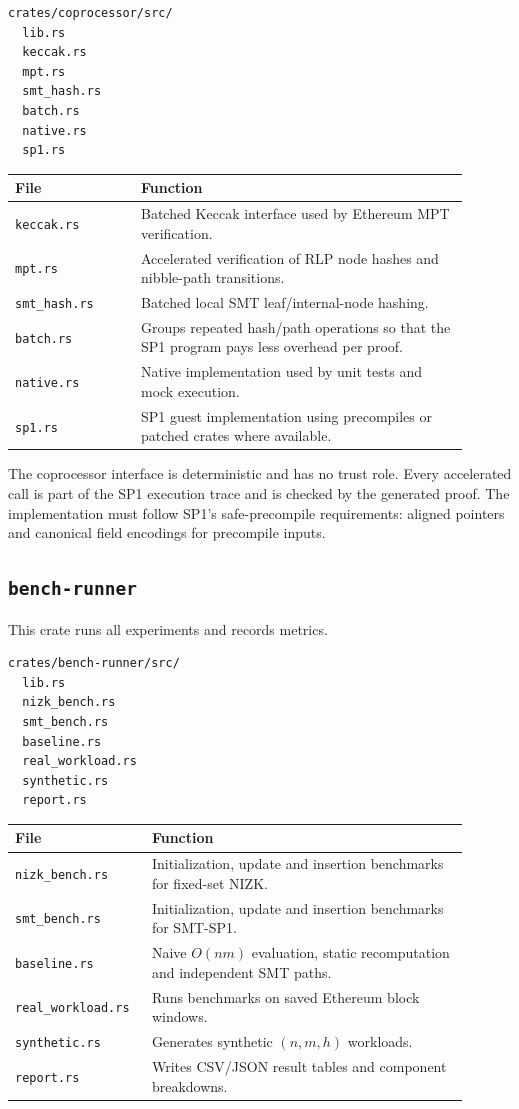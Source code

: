 \documentclass[UTF8,a4paper,11pt]{ctexart}
\begin{document}
\begin{lstlisting}
crates/coprocessor/src/
  lib.rs
  keccak.rs
  mpt.rs
  smt_hash.rs
  batch.rs
  native.rs
  sp1.rs
\end{lstlisting}

\begin{longtable}{p{0.25\linewidth}p{0.65\linewidth}}
\toprule
File & Function \\
\midrule
\texttt{keccak.rs} & Batched Keccak interface used by Ethereum MPT verification. \\
\texttt{mpt.rs} & Accelerated verification of RLP node hashes and nibble-path transitions. \\
\texttt{smt\_hash.rs} & Batched local SMT leaf/internal-node hashing. \\
\texttt{batch.rs} & Groups repeated hash/path operations so that the SP1 program pays less overhead per proof. \\
\texttt{native.rs} & Native implementation used by unit tests and mock execution. \\
\texttt{sp1.rs} & SP1 guest implementation using precompiles or patched crates where available. \\
\bottomrule
\end{longtable}

The coprocessor interface is deterministic and has no trust role. Every accelerated call is part of the SP1 execution trace and is checked by the generated proof. The implementation must follow SP1's safe-precompile requirements: aligned pointers and canonical field encodings for precompile inputs.

\subsection{\texttt{bench-runner}}

This crate runs all experiments and records metrics.

\begin{lstlisting}
crates/bench-runner/src/
  lib.rs
  nizk_bench.rs
  smt_bench.rs
  baseline.rs
  real_workload.rs
  synthetic.rs
  report.rs
\end{lstlisting}

\begin{longtable}{p{0.25\linewidth}p{0.65\linewidth}}
\toprule
File & Function \\
\midrule
\texttt{nizk\_bench.rs} & Initialization, update and insertion benchmarks for fixed-set NIZK. \\
\texttt{smt\_bench.rs} & Initialization, update and insertion benchmarks for SMT-SP1. \\
\texttt{baseline.rs} & Naive $O(nm)$ evaluation, static recomputation and independent SMT paths. \\
\texttt{real\_workload.rs} & Runs benchmarks on saved Ethereum block windows. \\
\texttt{synthetic.rs} & Generates synthetic $(n,m,h)$ workloads. \\
\texttt{report.rs} & Writes CSV/JSON result tables and component breakdowns. \\
\bottomrule
\end{longtable}
\end{document}
